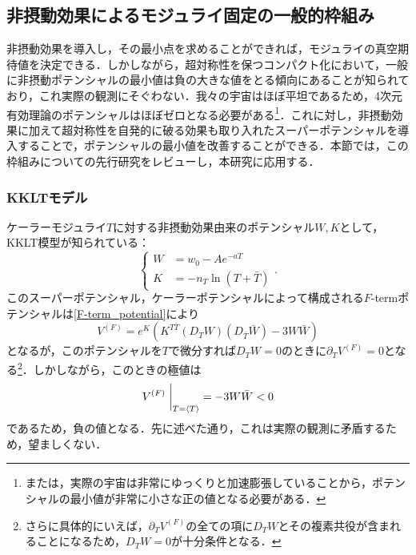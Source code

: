 \documentclass[a4paper,uplatex,dvipdfmx]{jsarticle}
\theoremstyle{definition}
\begin{document}
\subsection{非摂動効果によるモジュライ固定の一般的枠組み}
\label{review_moduli_stabilize}

非摂動効果を導入し，その最小点を求めることができれば，モジュライの真空期待値を決定できる．しかしながら，超対称性を保つコンパクト化において，一般に非摂動ポテンシャルの最小値は負の大きな値をとる傾向にあることが知られており，これ実際の観測にそぐわない．我々の宇宙はほぼ平坦であるため，4次元有効理論のポテンシャルはほぼゼロとなる必要がある\footnote{
   または，実際の宇宙は非常にゆっくりと加速膨張していることから，ポテンシャルの最小値が非常に小さな正の値となる必要がある．
}．これに対し，非摂動効果に加えて超対称性を自発的に破る効果も取り入れたスーパーポテンシャルを導入することで，ポテンシャルの最小値を改善することができる\cite{Abe_ModuliStabilization_2007a}．本節では，この枠組みについての先行研究をレビューし，本研究に応用する．


\subsubsection*{KKLTモデル}

ケーラーモジュライ$T$に対する非摂動効果由来のポテンシャル$W,K$として，KKLT模型\cite{Kachru_SitterVacua_2003}が知られている：
\begin{equation}
   \left\{
      \begin{alignedat}{1}
         W
         &=
         w_{0}
         -
         Ae^{-aT}
         \\
         K
         &=
         -n_{T}\ln(T+\bar{T})
      \end{alignedat}
   \right.
   .
   \label{potential_KKLT}
\end{equation}
このスーパーポテンシャル，ケーラーポテンシャルによって構成される$F$-termポテンシャルは\eqref{F-term_potential}により
\begin{equation}
   V^{(F)}
   =
   e^{K}
   \left(
      K^{T\bar{T}}(D_{T}W)(D_{\bar{T}}\bar{W})
      -
      3W\bar{W}
   \right)
   \nonumber
\end{equation}
となるが，このポテンシャルを$T$で微分すれば$D_{T}W=0$のときに$\partial_{T}V^{(F)}=0$となる\footnote{
   さらに具体的にいえば，$\partial_{T}V^{(F)}$の全ての項に$D_{T}W$とその複素共役が含まれることになるため，$D_{T}W=0$が十分条件となる．
}．しかしながら，このときの極値は
\begin{equation}
   V^{(F)}
   \left.\vphantom{\frac{1}{2}}\right|_{T=\ev*{T}}
   =
   -3W\bar{W}
   <
   0
\end{equation}
であるため，負の値となる．先に述べた通り，これは実際の観測に矛盾するため，望ましくない．
\end{document}
